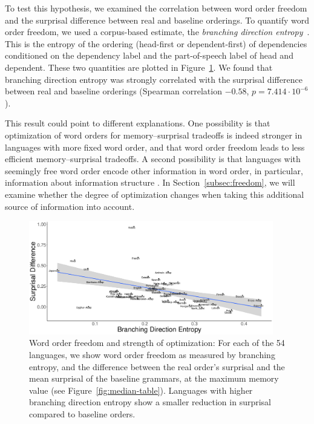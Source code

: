 To test this hypothesis, we examined the correlation between word order freedom and the surprisal difference between real and baseline orderings.
To quantify word order freedom, we used a corpus-based estimate, the \emph{branching direction entropy}~\citep{futrell-quantifying-2015}.
This is the entropy of the ordering (head-first or dependent-first) of dependencies conditioned on the dependency label and the part-of-speech label of head and dependent.
These two quantities are plotted in Figure~\ref{fig:freedom-surp}.
We found that branching direction entropy was strongly correlated with the surprisal difference between real and baseline orderings (Spearman correlation $-0.58$, $p = 7.414\cdot 10^{-6}$).

This result could point to different explanations.
One possibility is that optimization of word orders for memory--surprisal tradeoffs is indeed stronger in languages with more fixed word order, and that word order freedom leads to less efficient memory--surprisal tradeoffs.
A second possibility is that languages with seemingly free word order encode other information in word order, in particular, information about information structure \citep[e.g.]{givon1988pragmatics,firbas1966defining,firbas1974aspects,myhill1985pragmatic}.
In Section~\ref{subsec:freedom}, we will examine whether the degree of optimization changes when taking this additional source of information into account.




\begin{figure}
\includegraphics[width=0.95\textwidth]{figures/surprisal-branching-entropy-REAL-invert.pdf}
	\caption{Word order freedom and strength of optimization: For each of the 54 languages, we show word order freedom as measured by branching entropy, and the difference between the real order's surprisal and the mean surprisal of the baseline grammars, at the maximum memory value (see Figure~\ref{fig:median-table}).
	Languages with higher branching direction entropy show a smaller reduction in surprisal compared to baseline orders.
	}\label{fig:freedom-surp}
\end{figure}


